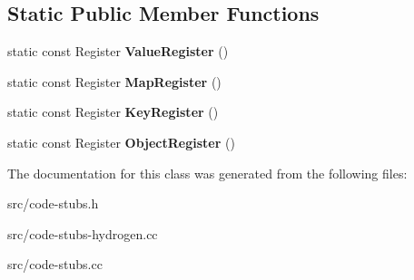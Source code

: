 \subsection*{Static Public Member Functions}
\begin{DoxyCompactItemize}
\item 
\hypertarget{classv8_1_1internal_1_1_elements_transition_and_store_stub_abeefc882483fc71ab32a012ee29ea082}{}static const Register {\bfseries Value\+Register} ()\label{classv8_1_1internal_1_1_elements_transition_and_store_stub_abeefc882483fc71ab32a012ee29ea082}

\item 
\hypertarget{classv8_1_1internal_1_1_elements_transition_and_store_stub_abc1e29a946366ea11bf8c4dca4b1b46b}{}static const Register {\bfseries Map\+Register} ()\label{classv8_1_1internal_1_1_elements_transition_and_store_stub_abc1e29a946366ea11bf8c4dca4b1b46b}

\item 
\hypertarget{classv8_1_1internal_1_1_elements_transition_and_store_stub_a45e9d2158f7426393e2606b736e20657}{}static const Register {\bfseries Key\+Register} ()\label{classv8_1_1internal_1_1_elements_transition_and_store_stub_a45e9d2158f7426393e2606b736e20657}

\item 
\hypertarget{classv8_1_1internal_1_1_elements_transition_and_store_stub_a5e9e8b04dc2833250f92a83be5c06a26}{}static const Register {\bfseries Object\+Register} ()\label{classv8_1_1internal_1_1_elements_transition_and_store_stub_a5e9e8b04dc2833250f92a83be5c06a26}

\end{DoxyCompactItemize}


The documentation for this class was generated from the following files\+:\begin{DoxyCompactItemize}
\item 
src/code-\/stubs.\+h\item 
src/code-\/stubs-\/hydrogen.\+cc\item 
src/code-\/stubs.\+cc\end{DoxyCompactItemize}
